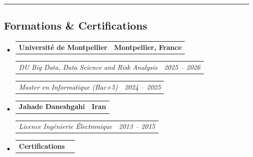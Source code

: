 \documentclass[11pt,a4paper]{article}
\makeatletter
\newcommand{\headerrow}[2]
{\begin{tabular*}{\linewidth}{l@{\extracolsep{\fill}}r}
#1 &
#2 \\
\end{tabular*}}
\makeatother
\begin{document}
\hrule
\vspace{-1em}
\subsection*{\Large Formations \& Certifications}

\begin{itemize}[leftmargin=1em]
	\parskip=0.1em
		
	\item
	      \headerrow
	      {\textbf{Université de Montpellier}}
	      {\textbf{Montpellier, France}}
	      \headerrow
	      {\emph{DU Big Data, Data Science and Risk Analysis}}
	      {\emph{2025 -- 2026}}
	      \headerrow
	      {\emph{Master en Informatique (Bac+5)}}
	      {\emph{2024 -- 2025}}
	      	      
	\item
	      \headerrow
	      {\textbf{Jahade Daneshgahi}}
	      {\textbf{Iran}}
	      \headerrow
	      {\emph{Licence Ingénierie Électronique}}
	      {\emph{2013 -- 2015}}

	\item
	      \headerrow
	      {\textbf{Certifications}}
	      {}

\end{itemize}
\end{document}
